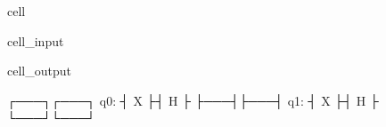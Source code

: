 \documentclass[letterpaper,10pt,english]{jupyterBook}
\begin{document}
\begin{sphinxuseclass}{cell}\begin{sphinxVerbatimInput}

\begin{sphinxuseclass}{cell_input}
\begin{sphinxVerbatim}[commandchars=\\\{\}]
   


\PYG{p}{[}\PYG{p}{]}
\PYG{p}{[}\PYG{p}{]}

\end{sphinxVerbatim}

\end{sphinxuseclass}\end{sphinxVerbatimInput}
\begin{sphinxVerbatimOutput}

\begin{sphinxuseclass}{cell_output}
\begin{sphinxVerbatim}[commandchars=\\\{\}]
     ┌───┐┌───┐
q\PYGZus{}0: ┤ X ├┤ H ├
     ├───┤├───┤
q\PYGZus{}1: ┤ X ├┤ H ├
     └───┘└───┘
\end{sphinxVerbatim}

\end{sphinxuseclass}\end{sphinxVerbatimOutput}

\end{sphinxuseclass}
\end{document}
